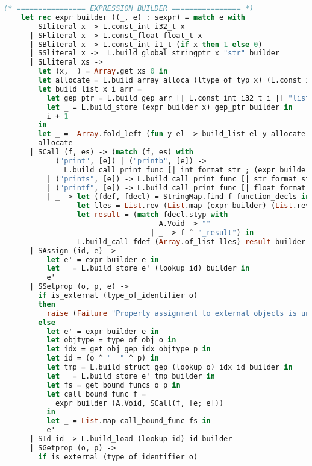 \begin{lstlisting}[language=Caml,backgroundcolor=\color{backgroundcolor}]
    (* ================ EXPRESSION BUILDER ================ *)
    let rec expr builder ((_, e) : sexpr) = match e with
        SIliteral x -> L.const_int i32_t x
      | SFliteral x -> L.const_float float_t x
      | SBliteral x -> L.const_int i1_t (if x then 1 else 0)
      | SSliteral x ->  L.build_global_stringptr x "str" builder
      | SLliteral xs -> 
        let (x, _) = Array.get xs 0 in
        let allocate = L.build_array_alloca (ltype_of_typ x) (L.const_int i32_t (Array.length xs)) "tmp_list" builder in
        let build_list x i arr =
          let gep_ptr = L.build_gep arr [| L.const_int i32_t i |] "list" builder in
          let _ = L.build_store (expr builder x) gep_ptr builder in 
          i + 1    
        in
        let _ =  Array.fold_left (fun y el -> build_list el y allocate) 0 (Array.of_list (List.rev (Array.to_list xs))) in 
        allocate
      | SCall (f, es) -> (match (f, es) with
            ("print", [e]) | ("printb", [e]) ->
              L.build_call print_func [| int_format_str ; (expr builder e) |] "print" builder
          | ("prints", [e]) -> L.build_call print_func [| str_format_str ; (expr builder e) |] "print" builder
          | ("printf", [e]) -> L.build_call print_func [| float_format_str ; (expr builder e) |] "print" builder
          | _ -> let (fdef, fdecl) = StringMap.find f function_decls in
                 let lles = List.rev (List.map (expr builder) (List.rev es)) in
                 let result = (match fdecl.styp with 
                                    A.Void -> ""
                                  | _ -> f ^ "_result") in
                 L.build_call fdef (Array.of_list lles) result builder)
      | SAssign (id, e) ->
          let e' = expr builder e in
          let _ = L.build_store e' (lookup id) builder in
          e'
      | SSetprop (o, p, e) ->
        if is_external (type_of_identifier o)
        then
          raise (Failure "Property assignment to external objects is unimplemented")
        else
          let e' = expr builder e in
          let objtype = type_of_obj o in
          let idx = get_obj_gep_idx objtype p in
          let id = (o ^ "__" ^ p) in
          let tmp = L.build_struct_gep (lookup o) idx id builder in
          let _ = L.build_store e' tmp builder in
          let fs = get_bound_funcs o p in
          let call_bound_func f =
            expr builder (A.Void, SCall(f, [e; e]))
          in
          let _ = List.map call_bound_func fs in
          e'
      | SId id -> L.build_load (lookup id) id builder
      | SGetprop (o, p) ->
        if is_external (type_of_identifier o)

\end{lstlisting}
